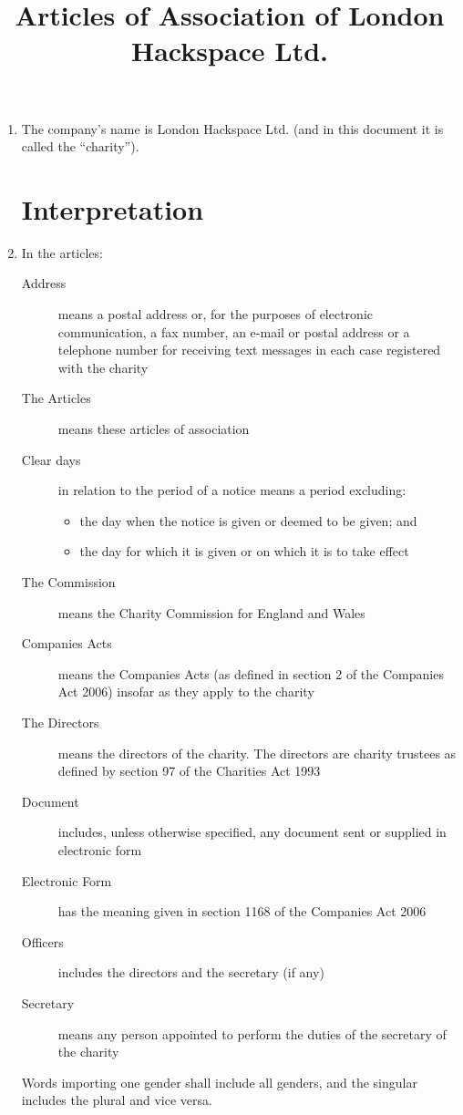 \title{Articles of Association of London Hackspace Ltd.}
\begin{enumerate}
\item
  The company's name is London Hackspace Ltd. (and in this document
  it is called the ``charity'').

\section{Interpretation}

\item
  In the articles:
  \begin{description}
  \item[Address] means a postal address or, for the purposes of
    electronic communication, a fax number, an e-mail or postal address
    or a telephone number for receiving text messages in each case
    registered with the charity
  \item[The Articles] means these articles of association
  \item[Clear days] in relation to the period of a notice means a period
    excluding:
    \begin{itemize}
    \item
      the day when the notice is given or deemed to be given; and
    \item
      the day for which it is given or on which it is to take effect
    \end{itemize}
  \item[The Commission] means the Charity Commission for England and Wales
  \item[Companies Acts] means the Companies Acts (as defined in section
    2 of the Companies Act 2006) insofar as they apply to the charity
  \item[The Directors] means the directors of the charity. The directors
    are charity trustees as defined by section 97 of the Charities Act
    1993
  \item[Document] includes, unless otherwise specified, any document
    sent or supplied in electronic form
  \item[Electronic Form] has the meaning given in section 1168 of the Companies Act 2006
  \item[Officers] includes the directors and the secretary (if any)
  \item[Secretary] means any person appointed to perform the duties of
    the secretary of the charity
  \end{description}
  Words importing one gender shall include all genders, and the singular
  includes the plural and vice versa.


\end{enumerate}
